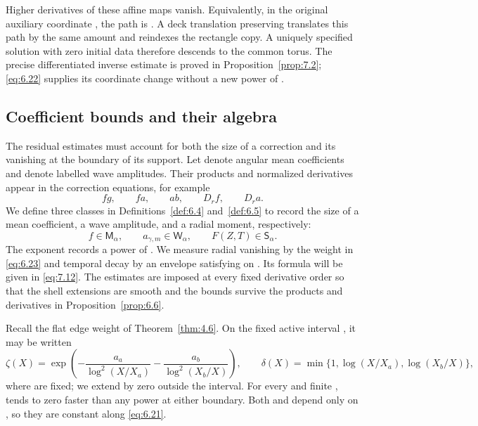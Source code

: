 %
Higher derivatives of these affine maps vanish. Equivalently, in the original
auxiliary coordinate , the path is
. A deck translation
preserving  translates this path by the same amount and
reindexes the rectangle copy. A uniquely specified solution with zero initial
data therefore descends to the common torus. The precise differentiated
inverse estimate is proved in Proposition~\ref{prop:7.2}; \eqref{eq:6.22}
supplies its coordinate change without a new power of
.

\subsection{Coefficient bounds and their algebra}\label{sec:6.4}

The residual estimates must account for both the size of a correction and its
vanishing at the boundary of its support. Let
 denote angular mean coefficients and
 denote labelled wave amplitudes. Their products and
normalized derivatives appear in the correction equations, for example
\[
  fg,\qquad fa,\qquad ab,\qquad D_rf,\qquad D_ra.
\]
We define three classes in Definitions~\ref{def:6.4} and~\ref{def:6.5} to
record the size of a mean coefficient, a wave amplitude, and a radial moment,
respectively:
\[
  f\in\mathsf M_\alpha,
  \qquad a_{\gamma,m}\in\mathsf W_\alpha,
  \qquad F(Z,T)\in\mathsf S_\alpha.
\]
The exponent  records a power of
. We measure radial vanishing by the weight
 in \eqref{eq:6.23} and temporal decay by an
envelope  satisfying
 on
. Its formula will be given in
\eqref{eq:7.12}. The estimates are imposed at every fixed derivative order so
that the shell extensions are smooth and the bounds survive the products and
derivatives in Proposition~\ref{prop:6.6}.

Recall the flat edge weight of Theorem~\ref{thm:4.6}. On the fixed active
interval , it may be written
\begin{equation}
  \zeta(X)=\exp\!\left(
    -\frac{a_a}{\log^2(X/X_a)}-\frac{a_b}{\log^2(X_b/X)}
  \right),
  \qquad
  \delta(X)=\min\{1,\log(X/X_a),\log(X_b/X)\},
  \tag{6.23}\label{eq:6.23}
\end{equation}
where  are fixed; we extend
 by zero outside the interval. For every
 and finite ,
 tends to zero faster than any power at
either boundary. Both  and
 depend only on , so they are
constant along \eqref{eq:6.21}.

